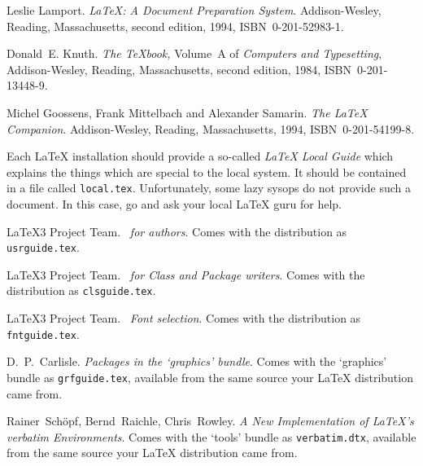 \begin{thebibliography}{99}
 Leslie Lamport.  \newblock \emph{{\LaTeX:} A Document
    Preparation System}.  \newblock Addison-Wesley, Reading,
  Massachusetts, second edition, 1994, ISBN~0-201-52983-1.
  
 Donald~E. Knuth.  \newblock \textit{The \TeX{}book,}
  Volume~A of \textit{Computers and Typesetting}, Addison-Wesley,
  Reading, Massachusetts, second edition, 1984, ISBN~0-201-13448-9.

 Michel Goossens, Frank Mittelbach and Alexander
  Samarin.  \newblock \emph{The {\LaTeX} Companion}.  \newblock
  Addison-Wesley, Reading, Massachusetts, 1994, ISBN~0-201-54199-8.
 
 Each \LaTeX{} installation should provide a so-called
  \emph{\LaTeX{} Local Guide} which explains the things which are
  special to the local system.  It should be contained in a file called
  \texttt{local.tex}. Unfortunately, some lazy sysops do not provide such a
  document. In this case, go and ask your local \LaTeX{} guru for help.
 
 \LaTeX3 Project Team.  \newblock \emph{\LaTeXe~for
    authors}.  \newblock Comes with the \LaTeXe{} distribution as
  \texttt{usrguide.tex}.

 \LaTeX3 Project Team.  \newblock \emph{\LaTeXe~for
    Class and Package writers}.  \newblock Comes with the \LaTeXe{}
  distribution as \texttt{clsguide.tex}.

 \LaTeX3 Project Team.  \newblock \emph{\LaTeXe~Font
    selection}.  \newblock Comes with the \LaTeXe{} distribution as
  \texttt{fntguide.tex}.

 D.~P.~Carlisle.  \newblock \emph{Packages in the
    `graphics' bundle}.  \newblock Comes with the `graphics' bundle as
  \texttt{grfguide.tex}, available from the same source your \LaTeX{}
  distribution came from.

 Rainer~Sch\"opf, Bernd~Raichle, Chris~Rowley.  
\newblock \emph{A New Implementation of \LaTeX's verbatim
  Environments}.
 \newblock Comes with the `tools' bundle as
  \texttt{verbatim.dtx}, available from the same source your \LaTeX{}
  distribution came from. 


\end{thebibliography}

